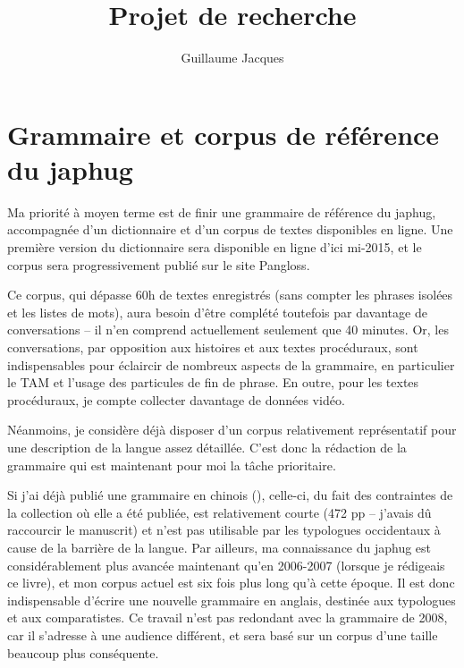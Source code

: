 \documentclass[oldfontcommands,oneside,a4paper,11pt]{article}
\begin{document}
\title{Projet de recherche} 
\author{Guillaume Jacques}
\maketitle

\sloppy
\tableofcontents
\section{Grammaire et corpus de référence du japhug}
Ma priorité à moyen terme est de finir une grammaire de référence du japhug, accompagnée d'un dictionnaire et d'un corpus de textes disponibles en ligne. Une première version du dictionnaire sera disponible en ligne d'ici mi-2015, et le corpus sera progressivement publié sur le site Pangloss. 

Ce corpus, qui dépasse 60h de textes enregistrés (sans compter les phrases isolées et les listes de mots), aura besoin d'être complété toutefois par davantage de conversations -- il n'en comprend actuellement seulement que 40 minutes. Or, les conversations, par opposition aux histoires et aux textes procéduraux, sont indispensables pour éclaircir de nombreux aspects de la grammaire, en particulier le TAM et l'usage des particules de fin de phrase. En outre, pour les textes procéduraux, je compte collecter davantage de données vidéo. 

Néanmoins, je considère déjà disposer d'un corpus relativement représentatif pour une description de la langue assez détaillée. C'est donc la rédaction de la grammaire qui est maintenant pour moi la tâche prioritaire.



Si j'ai déjà publié une grammaire en chinois (\citealt{jacques08zh}), celle-ci, du fait des contraintes de la collection où elle a été publiée, est relativement courte (472 pp -- j'avais dû raccourcir le manuscrit) et n'est pas utilisable par les typologues occidentaux à cause de la barrière de la langue. Par ailleurs, ma connaissance du japhug est considérablement plus avancée maintenant qu'en 2006-2007 (lorsque je rédigeais ce livre), et mon corpus actuel est six fois plus long qu'à cette époque. Il est donc indispensable d'écrire une nouvelle grammaire en anglais, destinée aux typologues et aux comparatistes.  Ce travail n'est pas redondant avec la grammaire de 2008, car il s'adresse à une audience différent, et sera basé sur un corpus d'une taille beaucoup plus conséquente.
\end{document}
